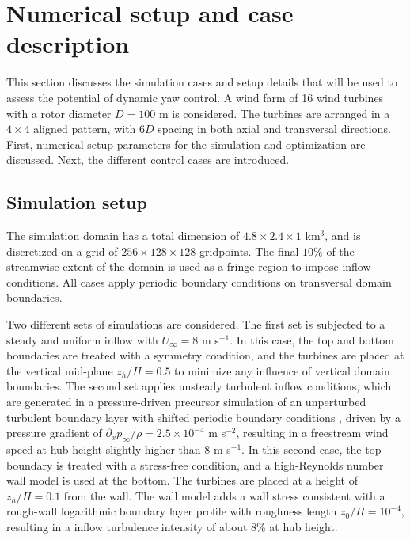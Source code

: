 \documentclass[energies,article,submit,moreauthors,latex,10pt,a4paper]{mdpi}
\begin{document}
\section{Numerical setup and case description}\label{sec:opt_yaw_setup}
\noindent This section discusses the simulation cases and setup details that will be used to assess the potential of dynamic yaw control. A wind farm of 16 wind turbines with a rotor diameter $D = 100$ m is considered. The turbines are arranged in a $4 \times 4$ aligned pattern, with $6D$ spacing in both axial and transversal directions. First, numerical setup parameters for the simulation and optimization are discussed. Next, the different control cases are introduced. 

\subsection{Simulation setup}
\noindent The simulation domain has a total dimension of $4.8 \times 2.4 \times 1 $ km$^3$, and is discretized on a grid of $256 \times 128 \times 128$ gridpoints. The final $10\%$ of the streamwise extent of the domain is used as a fringe region to impose inflow conditions. All cases apply periodic boundary conditions on transversal domain boundaries. 

Two different sets of simulations are considered. The first set is subjected to a steady and uniform inflow with $U_\infty = 8$ m s$^{-1}$. In this case, the top and bottom boundaries are treated with a symmetry condition, and the turbines are placed at the vertical mid-plane $z_h/H = 0.5$ to minimize any influence of vertical domain boundaries. The second set applies unsteady turbulent inflow conditions, which are generated in a pressure-driven precursor simulation of an unperturbed turbulent boundary layer with shifted periodic boundary conditions \cite{munters2016shifted}, driven by a pressure gradient of $\partial_x p_\infty/\rho = 2.5 \times 10^{-4}$ m s$^{-2}$, resulting in a freestream wind speed at hub height slightly higher than 8 m s$^{-1}$. In this second case, the top boundary is treated with a stress-free condition, and a high-Reynolds number wall model is used at the bottom. The turbines are placed at a height of $z_h/H = 0.1$ from the wall. The wall model adds a wall stress consistent with a rough-wall logarithmic boundary layer profile with roughness length $z_0/H = 10^{-4}$, resulting in a inflow turbulence intensity of about 8\% at hub height. 
\end{document}

